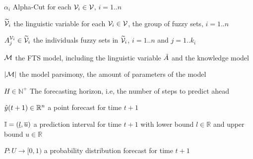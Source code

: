 \begin{simbolos}
\item[$\alpha_i$] Alpha-Cut for each $\mathcal{V}_i \in \mathcal{V}$, $i = 1..n$
\item[$\widetilde{\mathcal{V}}_i$] the linguistic variable for each $\mathcal{V}_i \in \mathcal{V}$, the group of fuzzy sets, $i = 1..n$
\item[$A_j^{\mathcal{V}_i} \in \widetilde{\mathcal{V}}_i$] the individuals fuzzy sets in $\widetilde{\mathcal{V}}_i$, $i = 1..n$ and $j = 1..k_i$
\item[$\mathcal{M}$] the FTS model, including the linguistic variable $\tilde{A}$ and the knowledge model
\item[$|\mathcal{M}|$] the model parsimony, the amount of parameters of the model
\item[$H \in \mathbb{N}^+$] The forecasting horizon, i.e, the number of steps to predict ahead
\item[$\hat{y}(t+1) \in \mathbb{R}^n$] a point forecast for time $t+1$
\item[$\mathbb{I} = (\underline{l},\overline{u})$] a prediction interval for time $t+1$ with lower bound $l \in \mathbb{R}$ and upper bound $u \in \mathbb{R}$
\item[$P: U \rightarrow [0,1)$] a probability distribution forecast for time $t+1$
\end{simbolos}
